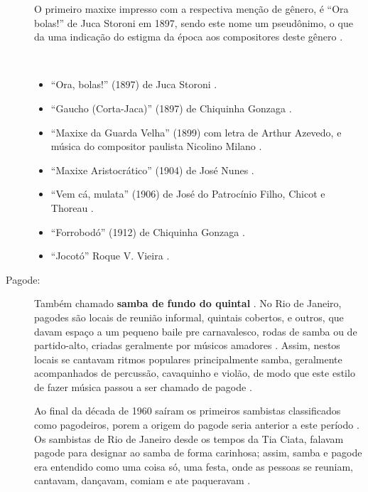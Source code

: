 \begin{description}
O primeiro maxixe impresso com a respectiva menção de gênero, é ``Ora bolas!'' de Juca Storoni em 1897,
sendo este nome um pseudônimo, o que da uma indicação do estigma da época aos compositores deste gênero \cite[pp. 80]{sandroni2001feitico} \cite[pp. 108]{efege1974maxixe}.

\begin{example} ~

\begin{itemize}
\item ``Ora, bolas!'' (1897) de Juca Storoni \cite[pp. 108]{efege1974maxixe}.
\item ``Gaucho (Corta-Jaca)'' (1897) de Chiquinha Gonzaga \cite{reportagemtvmaxixe} \cite[pp. 30]{efege1974maxixe}.
\item ``Maxixe da Guarda Velha'' (1899) com letra de Arthur Azevedo, 
e música do compositor paulista Nicolino Milano  \cite{reportagemtvmaxixe}. 
\item ``Maxixe Aristocrático'' (1904) de José Nunes \cite{REIS2003}.
\item ``Vem cá, mulata'' (1906) de José do Patrocínio Filho, Chicot e Thoreau \cite{REIS2003}.
\item ``Forrobodó'' (1912) de Chiquinha Gonzaga \cite{REIS2003} \cite{reportagemtvmaxixe}.
\item ``Jocotó'' Roque V. Vieira \cite{reportagemtvmaxixe}.
\end{itemize}
\end{example}

\item[Pagode:] 
Também chamado \textbf{samba de fundo do quintal}  \cite[pp. 130]{perna2002samba}.
No Rio de Janeiro, pagodes são locais de reunião informal, quintais cobertos, e outros,
que davam espaço a um pequeno baile pre carnavalesco, 
rodas de samba ou de partido-alto, criadas geralmente por músicos amadores \cite[pp. 130]{perna2002samba} \cite[pp. 241]{dourado2004dicionario} \cite[pp. 241]{dourado2004dicionario}.
Assim, nestos locais se cantavam ritmos populares principalmente samba,
geralmente acompanhados de percussão, cavaquinho e violão, 
de modo que este  estilo de fazer música passou a ser chamado de pagode \cite[pp. 63]{reinato2010musica}  \cite[pp. 130]{perna2002samba}.

Ao final da década de 1960 saíram os primeiros sambistas classificados como pagodeiros,
porem a origem do pagode seria anterior a este período \cite{sedano2018bezerra}.
Os sambistas de Rio de Janeiro desde os tempos da Tia Ciata, 
falavam pagode para designar ao samba de forma carinhosa; 
assim, samba e pagode era entendido como uma coisa só, uma festa, 
onde as pessoas se reuniam, cantavam, dançavam, comiam e ate paqueravam \cite[pp. 209]{diniz2006almanaque}.


\end{description}
